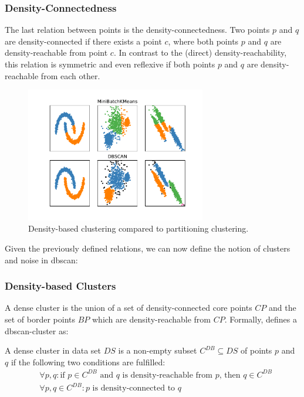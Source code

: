 \subsubsection*{Density-Connectedness}
The last relation between points is the density-connectedness. Two points $p$ and $q$ are density-connected if there exists a point $c$, where both points $p$ and $q$ are density-reachable from point $c$. In contrast to the (direct) density-reachability, this relation is symmetric and even reflexive if both points $p$ and $q$ are density-reachable from each other. 
\begin{figure}
    \centering
    \includegraphics[width=0.7\textwidth]{figures/KMeansVSDBSCAN.pdf}
    \caption{Density-based clustering compared to partitioning clustering.}
    \label{fig:kmeansdbscan}
\end{figure}

\vspace{5mm}

Given the previously defined relations, we can now define the notion of clusters and noise in \gls{dbscan}:

\subsubsection*{Density-based Clusters}
A dense cluster is the union of a set of density-connected core points $CP$ and the set of border points $BP$ which are density-reachable from $CP$.
Formally, \citeauthor{DBSCANEKSX96} defines a \gls{dbscan}-cluster as:

A dense cluster in data set $DS$ is a non-empty subset $C^{DB} \subseteq DS$ of points $p$ and $q$ if the following two conditions are fulfilled:
\begin{align}
    &\forall p, q: \text{if } p \in C^{DB} \text{ and } q \text{ is density-reachable from } p \text{, then } q \in C^{DB} \\
    &\forall p, q \in C^{DB}: p \text{ is density-connected to }q
\end{align}

